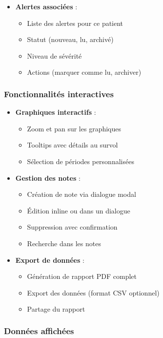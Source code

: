 \documentclass[a4paper,11pt]{report}
\begin{document}
\begin{itemize}
    \item \textbf{Alertes associées} :
    \begin{itemize}
        \item Liste des alertes pour ce patient
        \item Statut (nouveau, lu, archivé)
        \item Niveau de sévérité
        \item Actions (marquer comme lu, archiver)
    \end{itemize}
\end{itemize}

\subsubsection{Fonctionnalités interactives}

\begin{itemize}
    \item \textbf{Graphiques interactifs} :
    \begin{itemize}
        \item Zoom et pan sur les graphiques
        \item Tooltips avec détails au survol
        \item Sélection de périodes personnalisées
    \end{itemize}
    
    \item \textbf{Gestion des notes} :
    \begin{itemize}
        \item Création de note via dialogue modal
        \item Édition inline ou dans un dialogue
        \item Suppression avec confirmation
        \item Recherche dans les notes
    \end{itemize}
    
    \item \textbf{Export de données} :
    \begin{itemize}
        \item Génération de rapport PDF complet
        \item Export des données (format CSV optionnel)
        \item Partage du rapport
    \end{itemize}
\end{itemize}

\subsubsection{Données affichées}
\end{document}
